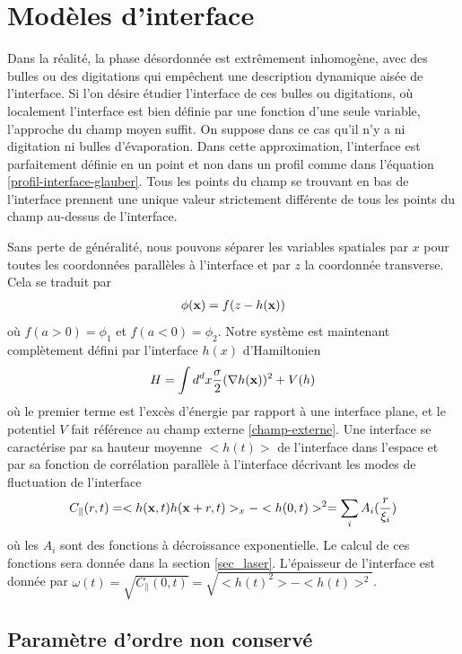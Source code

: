     \section{Modèles d'interface}

Dans la réalité, la phase désordonnée est extrêmement inhomogène, avec des bulles ou des digitations qui empêchent une description dynamique aisée de l'interface. Si l'on désire étudier l'interface de ces bulles ou digitations, où localement l'interface est bien définie par une fonction d'une seule variable, l'approche du champ moyen suffit. On suppose dans ce cas qu'il n'y a ni digitation ni bulles d'évaporation. Dans cette approximation, l'interface est parfaitement définie en un point et non dans un profil comme dans l'équation \ref{profil-interface-glauber}. Tous les points du champ se trouvant en bas de l'interface prennent une unique valeur strictement différente de tous les points du champ au-dessus de l'interface. 

Sans perte de généralité, nous pouvons séparer les variables spatiales par $x$ pour toutes les coordonnées parallèles à l'interface et par $z$ la coordonnée transverse. Cela se traduit par
\begin{align}
    \phi({\bf x}) = f(z-h({\bf x}))
    \label{capillary-wave-theory}
\end{align}
où $f(a \greater 0) = \phi_1$ et $f(a \less 0) = \phi_2$. Notre système est maintenant complètement défini par l'interface $h(x)$ d'Hamiltonien
\begin{align}
    H = \int d^d x \frac{\sigma}{2} (\nabla h({\bf x}))^2 + V(h)
    \label{hamil-cwt}
\end{align}
où le premier terme est l'excès d'énergie par rapport à une interface plane, et le potentiel $V$ fait référence au champ externe \ref{champ-externe}. 
Une interface se caractérise par sa hauteur moyenne $<h(t)>$ de l'interface dans l'espace et par sa fonction de corrélation parallèle à l'interface décrivant les modes de fluctuation de l'interface
\begin{align}
    C_\parallel(r,t) = <h({\bf x},t)h({\bf x}+r,t)>_x - <h(0,t)>^2 = \sum_i A_i(\frac{r}{\xi_i}) 
\end{align}
où les $A_i$ sont des fonctions à décroissance exponentielle. Le calcul de ces fonctions sera donnée dans la section \ref{sec_laser}. 
L'épaisseur de l'interface est donnée par $\omega(t) = \sqrt{C_\parallel(0,t)} = \sqrt{<h(t)^2> - <h(t)>^2}$. 

    \subsection{Paramètre d'ordre non conservé}

